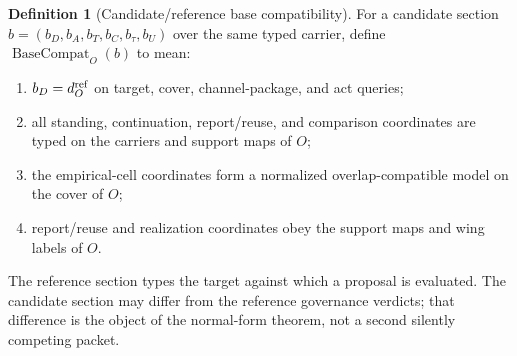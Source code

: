 \documentclass[11pt]{article}
\theoremstyle{definition}
\newtheorem{definition}[theorem]{Definition}
\begin{document}
\begin{definition}[Candidate/reference base compatibility]\label{def:referencesection}
For a candidate section $b=(b_D,b_A,b_T,b_C,b_{\tau},b_U)$ over the same typed carrier, define $\operatorname{BaseCompat}_O(b)$ to mean:
\begin{enumerate}[label=(R\arabic*),leftmargin=3em]
\item $b_D=d_O^{\rm ref}$ on target, cover, channel-package, and act queries;
\item all standing, continuation, report/reuse, and comparison coordinates are typed on the carriers and support maps of $O$;
\item the empirical-cell coordinates form a normalized overlap-compatible model on the cover of $O$;
\item report/reuse and realization coordinates obey the support maps and wing labels of $O$.
\end{enumerate}
The reference section types the target against which a proposal is evaluated. The candidate section may differ from the reference governance verdicts; that difference is the object of the normal-form theorem, not a second silently competing packet.
\end{definition}
\end{document}
